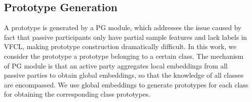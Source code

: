 \subsection{Prototype Generation}
A prototype is generated by a PG module, which addresses the issue caused by fact that passive participants only have partial sample features and lack labels in VFCL, making prototype construction dramatically difficult. 
In this work, we consider the prototype a prototype belonging to a certain class.
The mechanism of PG module is that an active party aggregates local embeddings from all passive parties to obtain global embeddings, so that the knowledge of all classes are encompassed. 
We use global embeddings to generate prototypes for each class for obtaining the corresponding class prototypes. 
%
%

